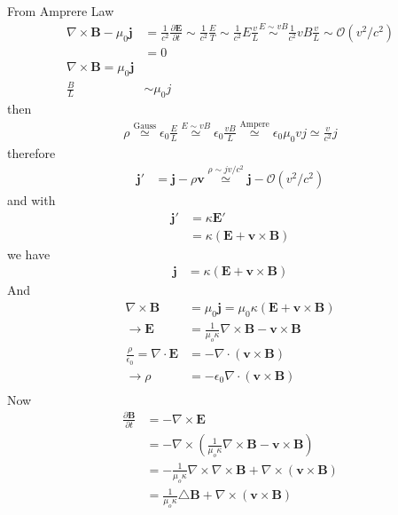 \documentclass[10pt,a4paper]{book}
\theoremstyle{definition}
\begin{document}
From Amprere Law
\begin{align}
\nabla\times\mathbf{B}-\mu_0\mathbf{j}&=\frac{1}{c^2}\frac{\partial\mathbf{E}}{\partial t}\sim\frac{1}{c^2}\frac{E}{T}\sim\frac{1}{c^2}E\frac{v}{L}\overset{E\sim vB}{\sim}\frac{1}{c^2}vB\frac{v}{L}\sim\mathcal{O}(v^2/c^2)\\
&=0\\
\nabla\times\mathbf{B}=\mu_0\mathbf{j}\\
\frac{B}{L}&\sim\mu_0j
\end{align}
then
\begin{align}
\rho
\overset{\text{Gauss}}{\simeq}\epsilon_0\frac{E}{L}
\overset{E\sim vB}{\simeq}\epsilon_0\frac{vB}{L}
\overset{\text{Ampere}}{\simeq}\epsilon_0\mu_0 vj
\simeq\frac{v}{c^2}j
\end{align}
therefore
\begin{align}
\mathbf{j}'&=\mathbf{j}-\rho\mathbf{v}
\overset{\rho\sim jv/c^2}{\simeq}\mathbf{j}-\mathcal{O}(v^2/c^2)
\end{align}
and with
\begin{align}
\mathbf{j}'
&=\kappa\mathbf{E}'\\
&=\kappa(\mathbf{E}+\mathbf{v}\times\mathbf{B})
\end{align}
we have
\begin{align}
\mathbf{j}&=\kappa(\mathbf{E}+\mathbf{v}\times\mathbf{B})
\end{align}
And
\begin{align}
\nabla\times\mathbf{B}&=\mu_0\mathbf{j}=\mu_0\kappa(\mathbf{E}+\mathbf{v}\times\mathbf{B})\\
\rightarrow\mathbf{E}&=\frac{1}{\mu_o\kappa}\nabla\times\mathbf{B}-\mathbf{v}\times\mathbf{B}\\
\frac{\rho}{\epsilon_0}=\nabla\cdot\mathbf{E}&=-\nabla\cdot(\mathbf{v}\times\mathbf{B})\\
\rightarrow\rho&=-\epsilon_0\nabla\cdot(\mathbf{v}\times\mathbf{B})\\
\end{align}
Now
\begin{align}
\frac{\partial\mathbf{B}}{\partial t}
&=-\nabla\times\mathbf{E}\\
&=-\nabla\times\left(\frac{1}{\mu_o\kappa}\nabla\times\mathbf{B}-\mathbf{v}\times\mathbf{B}\right)\\
&=-\frac{1}{\mu_o\kappa}\nabla\times\nabla\times\mathbf{B}+\nabla\times(\mathbf{v}\times\mathbf{B})\\
&=\frac{1}{\mu_o\kappa}\triangle\mathbf{B}+\nabla\times(\mathbf{v}\times\mathbf{B})
\end{align}
\end{document}
